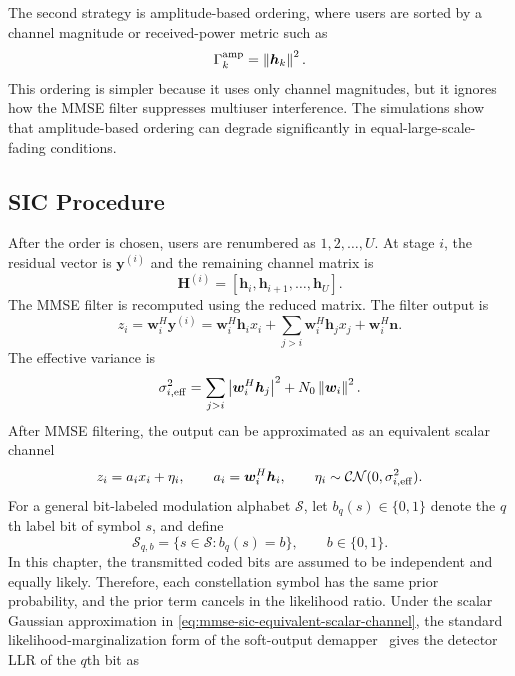 The second strategy is amplitude-based ordering, where users are sorted by a channel magnitude or received-power metric such as
\begin{equation}
    \Gamma^{\mathrm{amp}}_k=\left\lVert \bm{h}_k \right\rVert^2.
\end{equation}
This ordering is simpler because it uses only channel magnitudes, but it ignores how the MMSE filter suppresses multiuser interference. The simulations show that amplitude-based ordering can degrade significantly in equal-large-scale-fading conditions.

\subsection{SIC Procedure}

After the order is chosen, users are renumbered as $1,2,\ldots,U$. At stage $i$, the residual vector is $\bm{y}^{(i)}$ and the remaining channel matrix is
\begin{equation}
    \bm{H}^{(i)}=[\bm{h}_i,\bm{h}_{i+1},\ldots,\bm{h}_U].
\end{equation}
The MMSE filter is recomputed using the reduced matrix. The filter output is
\begin{equation}
    z_i =
    \bm{w}_i^H\bm{y}^{(i)}
    =
    \bm{w}_i^H\bm{h}_i x_i
    +
    \sum_{j>i}\bm{w}_i^H\bm{h}_j x_j
    +
    \bm{w}_i^H\bm{n}.
\end{equation}
The effective variance is
\begin{equation}
    \sigma^2_{i,\mathrm{eff}}
    =
    \sum_{j>i}\left\lvert \bm{w}_i^H\bm{h}_j \right\rvert^2
    +
    N_0\left\lVert \bm{w}_i \right\rVert^2 .
    \label{eq:mmse-sic-effective-variance}
\end{equation}
After MMSE filtering, the output can be approximated as an equivalent scalar channel
\begin{equation}
    z_i = a_i x_i+\eta_i,
    \qquad
    a_i=\bm{w}_i^H\bm{h}_i,
    \qquad
    \eta_i\sim\mathcal{CN}(0,\sigma^2_{i,\mathrm{eff}}).
    \label{eq:mmse-sic-equivalent-scalar-channel}
\end{equation}
For a general bit-labeled modulation alphabet $\mathcal{S}$, let
$b_q(s)\in\{0,1\}$ denote the $q$th label bit of symbol $s$, and define
\begin{equation}
    \mathcal{S}_{q,b}
    =
    \{s\in\mathcal{S}: b_q(s)=b\},
    \qquad b\in\{0,1\}.
\end{equation}
In this chapter, the transmitted coded bits are assumed to be independent and equally likely. Therefore, each constellation symbol has the same prior probability, and the prior term cancels in the likelihood ratio. Under the scalar Gaussian approximation in \eqref{eq:mmse-sic-equivalent-scalar-channel}, the standard likelihood-marginalization form of the soft-output demapper~\cite{shapiro2005soft} gives the detector LLR of the $q$th bit as
